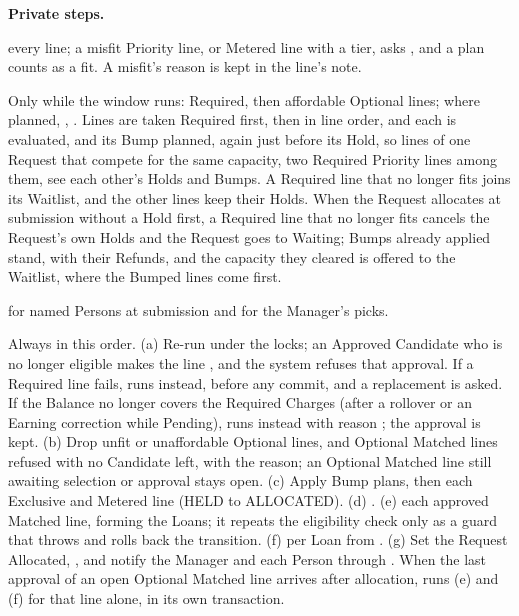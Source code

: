 \textbf{Private steps.}
\begin{description}[leftmargin=0pt,font=\normalfont\ttfamily]
\item[evaluateAll]  every line; a misfit Priority line, or Metered line with a tier, asks , and a plan counts as a fit. A misfit's reason is kept in the line's  note.
\item[placeHolds] Only while the window runs: Required, then affordable Optional lines;  where planned, , . Lines are taken Required first, then in line order, and each is evaluated, and its Bump planned, again just before its Hold, so lines of one Request that compete for the same capacity, two Required Priority lines among them, see each other's Holds and Bumps. A Required line that no longer fits joins its Waitlist, and the other lines keep their Holds. When the Request allocates at submission without a Hold first, a Required line that no longer fits cancels the Request's own Holds and the Request goes to Waiting; Bumps already applied stand, with their Refunds, and the capacity they cleared is offered to the Waitlist, where the Bumped lines come first.
\item[routeApprovals]  for named Persons at submission and for the Manager's picks.
\item[allocate] Always in this order. (a) Re-run  under the locks; an Approved Candidate who is no longer eligible makes the line , and the system refuses that approval. If a Required line fails,  runs instead, before any commit, and a replacement is asked. If the Balance no longer covers the Required Charges (after a rollover or an Earning correction while Pending),  runs instead with reason ; the approval is kept. (b) Drop unfit or unaffordable Optional lines, and Optional Matched lines refused with no Candidate left, with the reason; an Optional Matched line still awaiting selection or approval stays open. (c) Apply Bump plans, then  each Exclusive and Metered line (HELD to ALLOCATED). (d) . (e)  each approved Matched line, forming the Loans; it repeats the eligibility check only as a guard that throws  and rolls back the transition. (f)  per Loan from . (g) Set the Request Allocated, , and notify the Manager and each Person through . When the last approval of an open Optional Matched line arrives after allocation,  runs (e) and (f) for that line alone, in its own transaction.

\end{description}
